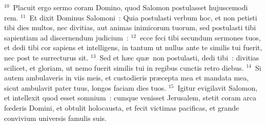 ${}^{10}$~Placuit ergo sermo coram Domino, quod Salomon postulasset hujuscemodi rem.
${}^{11}$~Et dixit Dominus Salomoni~: Quia postulasti verbum hoc, et non petisti tibi dies multos, nec divitias, aut animas inimicorum tuorum, sed postulasti tibi sapientiam ad discernendum judicium~:
${}^{12}$~ecce feci tibi secundum sermones tuos, et dedi tibi cor sapiens et intelligens, in tantum ut nullus ante te similis tui fuerit, nec post te surrecturus sit.
${}^{13}$~Sed et h\ae c qu\ae\ non postulasti, dedi tibi~: divitias scilicet, et gloriam, ut nemo fuerit similis tui in regibus cunctis retro diebus.
${}^{14}$~Si autem ambulaveris in viis meis, et custodieris pr\ae cepta mea et mandata mea, sicut ambulavit pater tuus, longos faciam dies tuos.
${}^{15}$~Igitur evigilavit Salomon, et intellexit quod esset somnium~: cumque venisset Jerusalem, stetit coram arca fœderis Domini, et obtulit holocausta, et fecit victimas pacificas, et grande convivium universis famulis suis.


